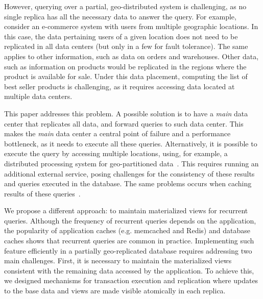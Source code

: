 \documentclass[sigplan,twocolumn,review,anonymous]{acmart}
\begin{document}
However, querying over a partial, geo-distributed system is challenging, as no single replica has all the necessary data to answer the query. %
For example, consider an e-commerce system with users from multiple geographic locations.
In this case, the data pertaining users of a given location does not need to be replicated in all data centers
(but only in a few for fault tolerance). The same applies to other information, such as data on orders and 
warehouses.
Other data, such as information on products would be replicated in the regions where the product
is available for sale.  
Under this data placement, computing the list of best seller products is challenging, as it requires
accessing data located at multiple data centers.

This paper addresses this problem. %
A possible solution is to
have a \emph{main} data center that replicates all data, and forward queries to such data center.
This makes the \emph{main} data center a central point of failure and a performance bottleneck, as it needs to execute all these queries.
Alternatively, 
it is possible to execute the query by accessing multiple locations, using, for example, 
a distributed processing system for geo-partitioned data~\cite{kloudas2015pixida,jetstream}.
This requires running an additional external service, posing challenges for the consistency of these results and 
queries executed in the database.
The same problems occurs when caching results of these queries~\cite{chronocache}.

We propose a different approach: to maintain materialized views for recurrent queries.
Although the frequency of recurrent
queries depends on the application, the popularity of application caches (e.g. memcached and Redis)  
and database caches \cite{chronocache} shows that recurrent queries are common in practice.
Implementing such feature efficiently in a partially geo-replicated database requires 
addressing two main challenges. 
First, it is necessary to maintain the materialized views consistent with the remaining data
accessed by the application. 
To achieve this, we designed mechanisms for transaction execution and replication where updates 
to the base data and views are made visible atomically in each replica.
\end{document}
